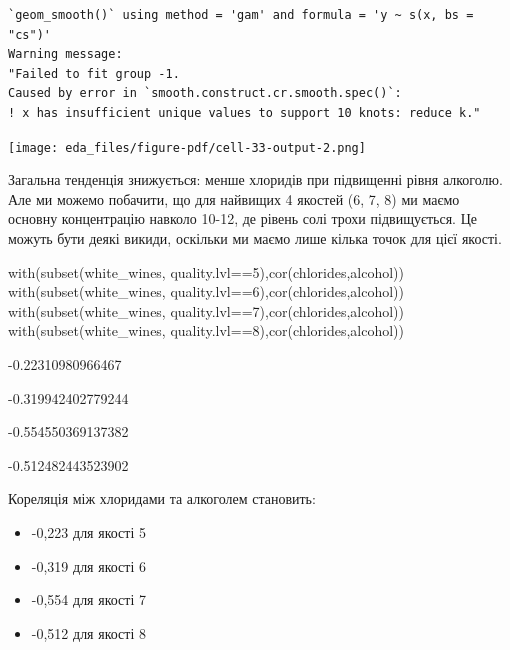 \documentclass[
  letterpaper,
  DIV=11,
  numbers=noendperiod]{scrreprt}
\newenvironment{Shaded}{\begin{snugshade}}{\end{snugshade}}
\newcommand{\DecValTok}[1]{\textcolor[rgb]{0.68,0.00,0.00}{#1}}
\newcommand{\FunctionTok}[1]{\textcolor[rgb]{0.28,0.35,0.67}{#1}}
\newcommand{\NormalTok}[1]{\textcolor[rgb]{0.00,0.23,0.31}{#1}}
\newcommand{\SpecialCharTok}[1]{\textcolor[rgb]{0.37,0.37,0.37}{#1}}
\providecommand{\tightlist}{%
  \setlength{\itemsep}{0pt}\setlength{\parskip}{0pt}}\usepackage{longtable,booktabs,array}
\begin{document}
\begin{verbatim}
`geom_smooth()` using method = 'gam' and formula = 'y ~ s(x, bs = "cs")'
Warning message:
"Failed to fit group -1.
Caused by error in `smooth.construct.cr.smooth.spec()`:
! x has insufficient unique values to support 10 knots: reduce k."
\end{verbatim}

\texttt{[image: eda\_files/figure-pdf/cell-33-output-2.png]}

Загальна тенденція знижується: менше хлоридів при підвищенні рівня
алкоголю. Але ми можемо побачити, що для найвищих 4 якостей (6, 7, 8) ми
маємо основну концентрацію навколо 10-12, де рівень солі трохи
підвищується. Це можуть бути деякі викиди, оскільки ми маємо лише кілька
точок для цієї якості.

\begin{Shaded}
\begin{Highlighting}[]
\FunctionTok{with}\NormalTok{(}\FunctionTok{subset}\NormalTok{(white\_wines, quality.lvl}\SpecialCharTok{==}\DecValTok{5}\NormalTok{),}\FunctionTok{cor}\NormalTok{(chlorides,alcohol))}
\FunctionTok{with}\NormalTok{(}\FunctionTok{subset}\NormalTok{(white\_wines, quality.lvl}\SpecialCharTok{==}\DecValTok{6}\NormalTok{),}\FunctionTok{cor}\NormalTok{(chlorides,alcohol))}
\FunctionTok{with}\NormalTok{(}\FunctionTok{subset}\NormalTok{(white\_wines, quality.lvl}\SpecialCharTok{==}\DecValTok{7}\NormalTok{),}\FunctionTok{cor}\NormalTok{(chlorides,alcohol))}
\FunctionTok{with}\NormalTok{(}\FunctionTok{subset}\NormalTok{(white\_wines, quality.lvl}\SpecialCharTok{==}\DecValTok{8}\NormalTok{),}\FunctionTok{cor}\NormalTok{(chlorides,alcohol))}
\end{Highlighting}
\end{Shaded}

-0.22310980966467

-0.319942402779244

-0.554550369137382

-0.512482443523902

Кореляція між хлоридами та алкоголем становить:

\begin{itemize}
\tightlist
\item
  -0,223 для якості 5
\item
  -0,319 для якості 6
\item
  -0,554 для якості 7
\item
  -0,512 для якості 8
\end{itemize}
\end{document}
